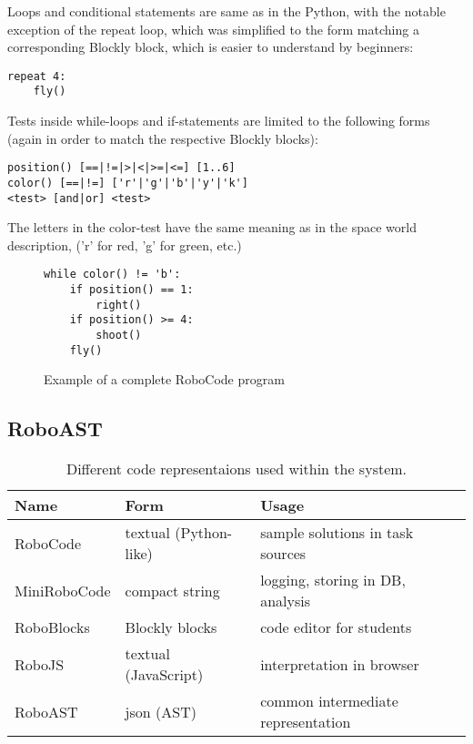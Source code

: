 Loops and conditional statements are same as in the Python,
with the notable exception of the repeat loop,
which was simplified to the form matching a corresponding
Blockly block, which is easier to understand by beginners:
\begin{lstlisting}
repeat 4:
    fly()
\end{lstlisting}

Tests inside while-loops and if-statements are limited to the following forms
(again in order to match the respective Blockly blocks):
\begin{lstlisting}
position() [==|!=|>|<|>=|<=] [1..6]
color() [==|!=] ['r'|'g'|'b'|'y'|'k']
<test> [and|or] <test>
\end{lstlisting}
The letters in the color-test have the same meaning as in the space world description,
('r' for red, 'g' for green, etc.)


\begin{figure}[h]
\begin{lstlisting}
while color() != 'b':
    if position() == 1:
        right()
    if position() >= 4:
        shoot()
    fly()
\end{lstlisting}
\caption{Example of a complete RoboCode program}
\label{fig:robocode-example}
\end{figure}


\subsection{RoboAST}

\begin{table}[h]
\begin{center}
\begin{tabular}{l l l}
\toprule
Name & Form & Usage  \\
\midrule
RoboCode     & textual (Python-like) & sample solutions in task sources  \\
MiniRoboCode & compact string & logging, storing in DB, analysis  \\
RoboBlocks   & Blockly blocks & code editor for students  \\
RoboJS       & textual (JavaScript) & interpretation in browser  \\
RoboAST      & json (AST) & common intermediate representation \\
\bottomrule
\end{tabular}
\end{center}
\caption{Different code representaions used within the system.}
\label{tbl:code-representation}
\end{table}

